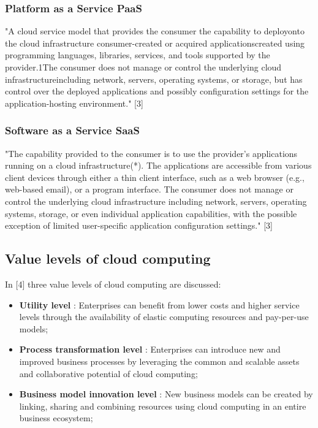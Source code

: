 \subsubsection{Platform as a Service PaaS}

"A cloud service model that provides the consumer the capability to deployonto the cloud infrastructure consumer-created or acquired applicationscreated using programming languages, libraries, services, and tools supported by the provider.1The consumer does not manage or control the underlying cloud infrastructureincluding network, servers, operating systems, or storage, but has control over the deployed applications and possibly configuration settings for the application-hosting environment." [3]



\subsubsection{Software as a Service SaaS}

"The capability provided to the consumer is to use the provider's applications running on a cloud infrastructure(*). The applications are accessible from various client devices through either a thin client interface, such as a web browser (e.g., web-based email), or a program interface. The consumer does not manage or control the underlying cloud infrastructure including network, servers, operating systems, storage, or even individual application capabilities, with the possible exception of limited user-specific application configuration settings." [3]

\subsection{Value levels of cloud computing}

In [4] three value levels of cloud computing are discussed:
\begin{itemize}
	\item \textbf{Utility level} : Enterprises can benefit from lower costs and higher service levels through the availability of elastic computing resources and pay-per-use models;
	\item \textbf{Process transformation level} : Enterprises can introduce new and improved business processes by leveraging the common and scalable assets and collaborative potential of cloud computing;
	\item \textbf{Business model innovation level} : New business models can be created by linking, sharing and combining resources using cloud computing in an entire business ecosystem;
\end{itemize}



